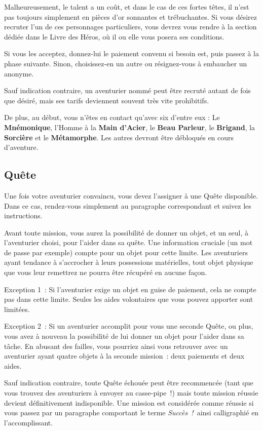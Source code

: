 \documentclass{report}
\newcommand{\success}{\emph{Succès !}}
\newcommand{\hero}[1]{\textbf{#1}}
\begin{document}
Malheureusement, le talent a un coût, et dans le cas de ces fortes têtes, il n'est pas toujours simplement en pièces d'or sonnantes et trébuchantes. Si vous désirez recruter l'un de ces personnages particuliers, vous devrez vous rendre à la section dédiée dans le Livre des Héros, où il ou elle vous posera ses conditions.

Si vous les acceptez, donnez-lui le paiement convenu si besoin est, puis passez à la phase suivante. Sinon, choisissez-en un autre ou résignez-vous à embaucher un anonyme.

Sauf indication contraire, un aventurier nommé peut être recruté autant de fois que désiré, mais ses tarifs deviennent souvent très vite prohibitifs.

De plus, au début, vous n'êtes en contact qu'avec six d'entre eux : Le \hero{Mnémonique}, l’Homme à la \hero{Main d’Acier}, le \hero{Beau Parleur}, le \hero{Brigand}, la \hero{Sorcière} et le \hero{Métamorphe}. Les autres devront être débloqués en cours d'aventure.

\subsection{Quête}

Une fois votre aventurier convaincu, vous devez l'assigner à une Quête disponible. Dans ce cas, rendez-vous simplement au paragraphe correspondant et suivez les instructions.

Avant toute mission, vous aurez la possibilité de donner un objet, et un seul, à l'aventurier choisi, pour l'aider dans sa quête. Une information cruciale (un mot de passe par exemple) compte pour un objet pour cette limite. Les aventuriers ayant tendance à s'accrocher à leurs possessions matérielles, tout objet physique que vous leur remettrez ne pourra être récupéré en aucune façon.

Exception 1 : Si l'aventurier exige un objet en guise de paiement, cela ne compte pas dans cette limite. Seules les aides volontaires que vous pouvez apporter sont limitées.

Exception 2 : Si un aventurier accomplit pour vous une seconde Quête, ou plus, vous avez à nouveau la possibilité de lui donner un objet pour l'aider dans sa tâche. En abusant des failles, vous pourriez ainsi vous retrouver avec un aventurier ayant quatre objets à la seconde mission : deux paiements et deux aides.

Sauf indication contraire, toute Quête échouée peut être recommencée (tant que vous trouvez des aventuriers à envoyer au casse-pipe !) mais toute mission réussie devient définitivement indisponible. Une mission est considérée comme réussie si vous passez par un paragraphe comportant le terme \success~ainsi calligraphié en l'accomplissant.
\end{document}

